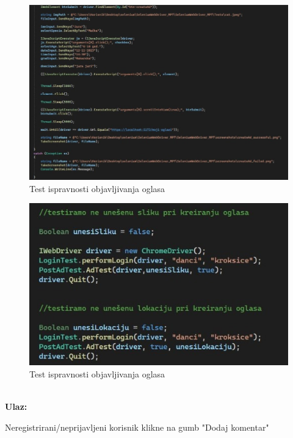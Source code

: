 			\begin{figure}[H]
				\includegraphics[width=\textwidth]{2test_postad_2.JPEG}
				\centering
				\caption{Test ispravnosti objavljivanja oglasa}
				\label{fig:testpostad2}
			\end{figure}
			\begin{figure}[H]
				\includegraphics[width=\textwidth]{2test_kreiranje_oglasa_bez_slike_lokacije.JPEG}
				\centering
				\caption{Test ispravnosti objavljivanja oglasa}
				\label{fig:testbezslikelokacije}
			\end{figure}
			
			\noindent {}\\
			\textbf{Ulaz: }	
			\begin{packed_enum}
				\item Neregistrirani/neprijavljeni korisnik klikne na gumb "Dodaj komentar"
				
			\end{packed_enum}
			
